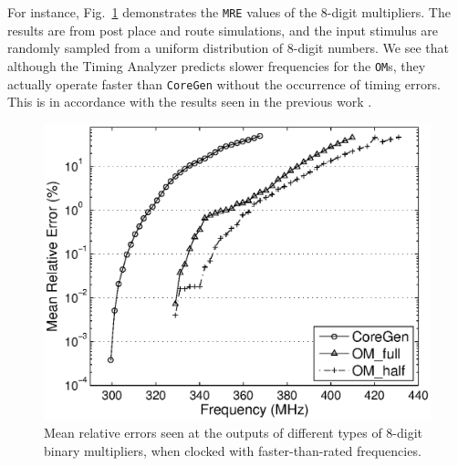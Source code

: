 \documentclass[conference]{IEEEtran}
\begin{document}
For instance, Fig.~\ref{Fig:PM_MRE} demonstrates the \texttt{MRE} values of the 8-digit multipliers. The results are from post place and route simulations, and the input stimulus are randomly sampled from a uniform distribution of 8-digit numbers. We see that although the Timing Analyzer predicts slower frequencies for the \texttt{OM}s, they actually operate faster than \texttt{CoreGen} without the occurrence of timing errors. This is in accordance with the results seen in the previous work \cite{SKDAC14}.

\begin{figure}[tbp]
  \centering
  \includegraphics[width=.48\textwidth]{./Figures/Exp/MRE_PM.eps}
  \vspace{-3ex}
  \caption{Mean relative errors seen at the outputs of different types of 8-digit binary multipliers, when clocked with faster-than-rated frequencies.}
  \label{Fig:PM_MRE}
  \vspace{-1ex}
\end{figure}




%
\end{document}
